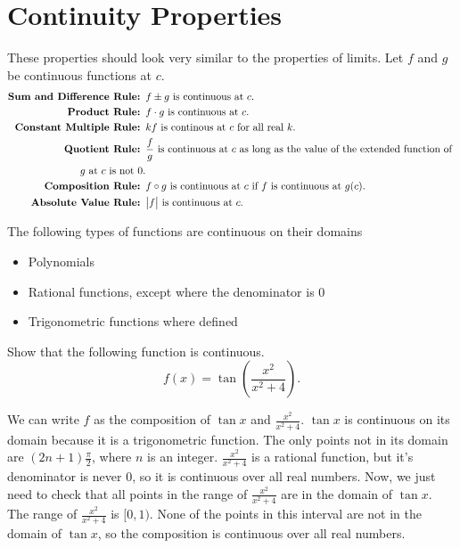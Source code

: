 \section{Continuity Properties}
These properties should look very similar to the properties of limits.
Let $f$ and $g$ be continuous functions at $c$.
\begin{align*}
	\textbf{Sum and Difference Rule: }& f \pm g \text{ is continuous at } c. \\
	\textbf{Product Rule: }& f \cdot g \text{ is continuous at } c. \\
	\textbf{Constant Multiple Rule: }& kf \text{ is continous at } c \text{ for all real } k. \\
	\textbf{Quotient Rule: }& \frac{f}{g} \text{ is continuous at } c \text{ as long as the value of the extended function of } \\
		g \text{ at } c \text{ is not } 0. \\
	\textbf{Composition Rule: }& f \circ g \text{ is continuous at } c \text{ if } f \text{ is continuous at } g(c). \\
	\textbf{Absolute Value Rule: }& \big\lvert f \big\rvert \text{ is continuous at } c.
\end{align*}

The following types of functions are continuous on their domains
\begin{itemize}
	\item Polynomials
	\item Rational functions, except where the denominator is 0
	\item Trigonometric functions where defined
\end{itemize}

\begin{example}
	Show that the following function is continuous.
	\begin{equation*}
		f(x) = \tan{\left(\frac{x^2}{x^2+4}\right)}.
	\end{equation*}
\end{example}
\begin{answer}
	We can write $f$ as the composition of $\tan{x}$ and $\frac{x^2}{x^2+4}$.
	$\tan{x}$ is continuous on its domain because it is a trigonometric function.
	The only points not in its domain are $(2n+1)\frac{\pi}{2}$, where $n$ is an integer.
	$\frac{x^2}{x^2+4}$ is a rational function, but it's denominator is never $0$, so it is continuous over all real numbers.
	Now, we just need to check that all points in the range of $\frac{x^2}{x^2+4}$ are in the domain of $\tan{x}$.
	The range of $\frac{x^2}{x^2+4}$ is $[0,1)$.
	None of the points in this interval are not in the domain of $\tan{x}$, so the composition is continuous over all real numbers.
\end{answer}